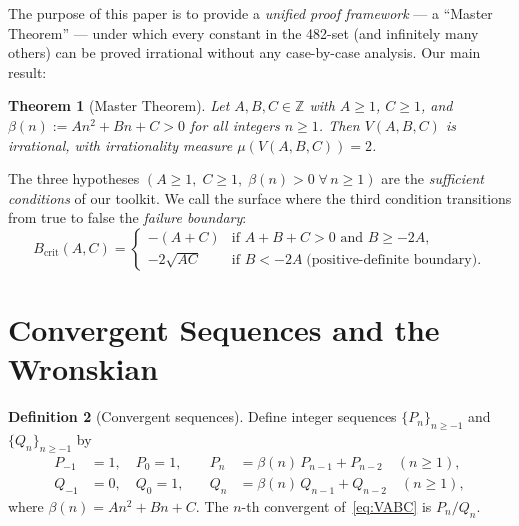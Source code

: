 \documentclass[11pt,a4paper]{article}
\newtheorem{theorem}{Theorem}
\theoremstyle{definition}
\newtheorem{definition}[theorem]{Definition}
\theoremstyle{remark}
\begin{document}
The purpose of this paper is to provide a \emph{unified proof framework}
--- a ``Master Theorem'' --- under which every constant in the 482-set
(and infinitely many others) can be proved irrational without any
case-by-case analysis.  Our main result:

\begin{theorem}[Master Theorem]\label{thm:master}
Let $A, B, C \in \mathbb{Z}$ with $A \ge 1$, $C \ge 1$, and
$\beta(n) := An^2 + Bn + C > 0$ for all integers $n \ge 1$.
Then $V(A,B,C)$ is irrational, with irrationality measure
$\mu(V(A,B,C)) = 2$.
\end{theorem}

The three hypotheses $(A \ge 1,\; C \ge 1,\; \beta(n)>0\;\forall\, n\ge 1)$
are the \emph{sufficient conditions} of our toolkit.
We call the surface where the third condition transitions from true to
false the \emph{failure boundary}:
\begin{equation}\label{eq:boundary}
  B_{\mathrm{crit}}(A,C) = \begin{cases}
    -(A+C) & \text{if } A + B + C > 0 \text{ and } B \ge -2A,\\
    -2\sqrt{AC} & \text{if } B < -2A \;\text{(positive-definite boundary)}.
  \end{cases}
\end{equation}


\section{Convergent Sequences and the Wronskian}\label{sec:wronskian}

\begin{definition}[Convergent sequences]
Define integer sequences $\{P_n\}_{n \ge -1}$ and $\{Q_n\}_{n \ge -1}$ by
\begin{equation}\label{eq:recurrence}
\begin{aligned}
  P_{-1} &= 1, \quad P_0 = 1, \quad &P_n &= \beta(n)\,P_{n-1} + P_{n-2}
    \quad(n \ge 1),\\
  Q_{-1} &= 0, \quad Q_0 = 1, \quad &Q_n &= \beta(n)\,Q_{n-1} + Q_{n-2}
    \quad(n \ge 1),
\end{aligned}
\end{equation}
where $\beta(n) = An^2 + Bn + C$.
The $n$-th convergent of~\eqref{eq:VABC} is $P_n/Q_n$.
\end{definition}
\end{document}
